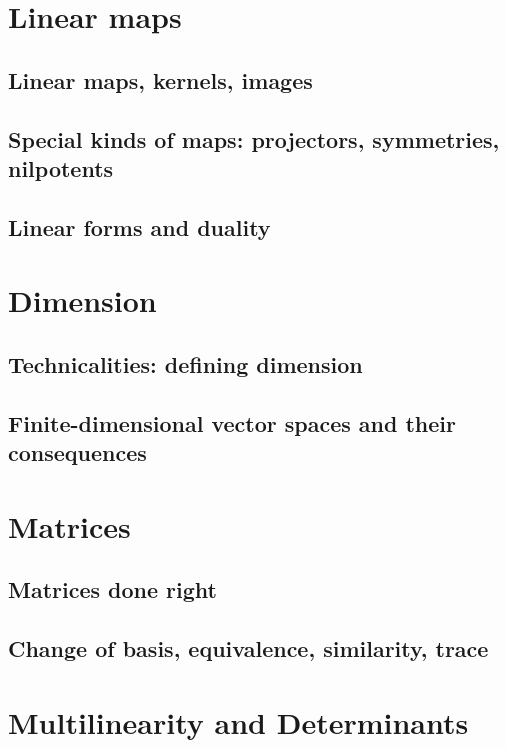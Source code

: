 \documentclass{book}
\theoremstyle{plain}
\theoremstyle{definition}
\theoremstyle{remark}
\begin{document}
\chapter{Linear maps}

\section{Linear maps, kernels, images}

\section{Special kinds of maps: projectors, symmetries, nilpotents}

\section{Linear forms and duality}

\chapter{Dimension}

\section{Technicalities: defining dimension}

\section{Finite-dimensional vector spaces and their consequences}

\chapter{Matrices}

\section{Matrices done right}

\section{Change of basis, equivalence, similarity, trace}

\chapter{Multilinearity and Determinants}
\end{document}
